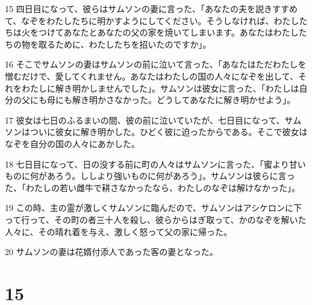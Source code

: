 \par 15 四日目になって、彼らはサムソンの妻に言った、「あなたの夫を説きすすめて、なぞをわたしたちに明かすようにしてください。そうしなければ、わたしたちは火をつけてあなたとあなたの父の家を焼いてしまいます。あなたはわたしたちの物を取るために、わたしたちを招いたのですか」。
\par 16 そこでサムソンの妻はサムソンの前に泣いて言った、「あなたはただわたしを憎むだけで、愛してくれません。あなたはわたしの国の人々になぞを出して、それをわたしに解き明かしませんでした」。サムソンは彼女に言った、「わたしは自分の父にも母にも解き明かさなかった。どうしてあなたに解き明かせよう」。
\par 17 彼女は七日のふるまいの間、彼の前に泣いていたが、七日目になって、サムソンはついに彼女に解き明かした。ひどく彼に迫ったからである。そこで彼女はなぞを自分の国の人々にあかした。
\par 18 七日目になって、日の没する前に町の人々はサムソンに言った、「蜜より甘いものに何があろう。ししより強いものに何があろう」。サムソンは彼らに言った、「わたしの若い雌牛で耕さなかったなら、わたしのなぞは解けなかった」。
\par 19 この時、主の霊が激しくサムソンに臨んだので、サムソンはアシケロンに下って行って、その町の者三十人を殺し、彼らからはぎ取って、かのなぞを解いた人々に、その晴れ着を与え、激しく怒って父の家に帰った。
\par 20 サムソンの妻は花婿付添人であった客の妻となった。

\chapter{15}

